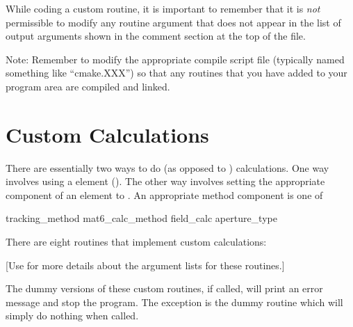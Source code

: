 While coding a custom routine, it is important to remember that it is {\em not}
permissible to modify any routine argument that does not appear in the list of output
arguments shown in the comment section at the top of the file.

Note: Remember to modify the appropriate compile script file (typically named something
like ``cmake.XXX'') so that any routines that you have added to your program area are
compiled and linked.

\section{Custom Calculations}
\label{s:custom.ele}

There are essentially two ways to do  (as opposed to  ) calculations. One way
involves using a  element (). The other way involves setting the
appropriate  component of an element to . An appropriate method
component is one of
\begin{example}
  tracking_method       
  mat6_calc_method      
  field_calc            
  aperture_type         
\end{example}

There are eight routines that implement custom calculations:
\begin{example}
\end{example}
[Use  for more details about the argument lists for these
routines.]  

The dummy versions of these custom routines, if called, will print an error message and
stop the program. The exception is the dummy  routine which will simply do
nothing when called.


